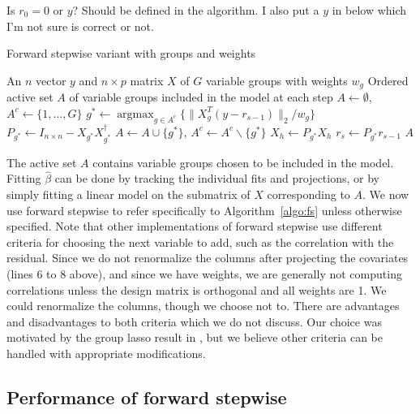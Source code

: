 \documentclass{imsart}
\newcommand{\argmax}{\mathop{\mathrm{argmax}}}
\newcommand{\norm}[1]{\lVert #1 \rVert}
\newcommand{\jonathan}[1]{{\color{blue}  #1}}
\begin{document}
\jonathan{Is $r_0=0$ or $y$? Should be defined in the algorithm. I also put a $y$ in below which I'm not sure
is correct or not. }

\begin{algorithm}
  \caption{Forward stepwise variant with groups and weights}
  \label{algo:fs}
  \begin{algorithmic}[1]
    \REQUIRE An $n$ vector $y$ and $n \times p$ matrix $X$ of $G$ variable groups with weights $w_g$
    \ENSURE Ordered active set $A$ of variable groups included in the model at each step
    \STATE $A \gets \emptyset$, $A^c \gets \{ 1, \ldots, G\}$
    \STATE $g^* \gets \argmax_{g \in A^c} \{ \norm{X_g^T(y- r_{s-1})}_2 / w_g \}$
    \STATE $P_{g^*} \gets I_{n\times n} - X_{g^*}X_{g^*}^\dagger$
    \STATE $A \gets A \cup \{ g^* \}$, $A^c \gets A^c \backslash \{ g^* \}$
      \STATE $X_h \gets P_{g^*} X_h$
    \ENDFOR
    \STATE $r_s \gets P_{g^*} r_{s-1}$
    \ENDFOR
    \RETURN $A$
  \end{algorithmic}
\end{algorithm}

The active set $A$ contains variable groups chosen to be included in
the model. Fitting $\hat \beta$ can be done by tracking the individual
fits and projections, or by simply fitting a linear model on the submatrix
of $X$ corresponding to $A$. 
We now use forward stepwise to refer specifically to
Algorithm~\ref{algo:fs} unless otherwise specified. Note that other
implementations of forward stepwise use different criteria for choosing
the next variable to add, such as the correlation with the residual.
Since we do not renormalize the columns after projecting the covariates
(lines 6 to 8 above), and since we have weights, we are generally not computing
correlations unless the design matrix is orthogonal and all weights are 1. We could
renormalize the columns, though we choose not to.
There are advantages and disadvantages to both criteria which we do not
discuss. Our choice was motivated by the group lasso result in
\cite{tests:adaptive}, but we believe other criteria can be handled
with appropriate modifications.

\subsection{Performance of forward stepwise}
\end{document}
